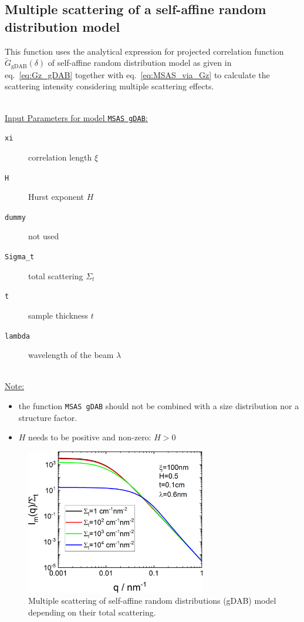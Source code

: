 \newpage
\subsection{Multiple scattering of a self-affine random distribution model}

This function uses the analytical expression for projected correlation function $\tilde{G}_\mathrm{gDAB}(\delta)$ of self-affine random distribution model as given in eq.\ \ref{eq:Gz_gDAB} together with eq.\ \ref{eq:MSAS_via_Gz} to calculate the scattering intensity considering multiple scattering effects.

\hspace{1pt}\\
\uline{Input Parameters for model \texttt{MSAS gDAB}:}\\
\begin{description}
\item[\texttt{xi}] correlation length $\xi$
\item[\texttt{H}] Hurst exponent $H$
\item[\texttt{dummy}] not used
\item[\texttt{Sigma\_t}] total scattering $\Sigma_t$
\item[\texttt{t}] sample thickness $t$
\item[\texttt{lambda}] wavelength of the beam $\lambda$
\end{description}

\hspace{1pt}\\
\uline{Note:}
\begin{itemize}
\item the function \texttt{MSAS gDAB} should not be combined with a size distribution nor a structure factor.
\item $H$ needs to be positive and non-zero: $H > 0$
\end{itemize}

\begin{figure}[htb]
\begin{center}
\includegraphics[width=0.7\textwidth]{../images/form_factor/MSAS/MSAS_gDAB.png}
\end{center}
\caption{Multiple scattering of self-affine random distributions (gDAB) model depending on their total scattering.}
\label{fig:MSAS_gDAB}
\end{figure} 